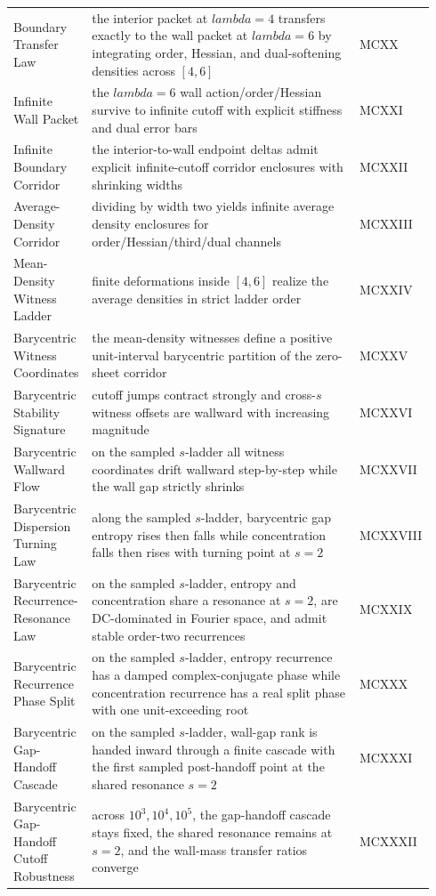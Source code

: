 \documentclass[11pt]{article}
\def\lambda{lambda}%
\begin{document}
{\begin{longtable}{>{\raggedright\arraybackslash}p{0.18\linewidth} >{\raggedright\arraybackslash}p{0.63\linewidth} >{\raggedright\arraybackslash}p{0.13\linewidth}}
Boundary Transfer Law & the interior packet at $\lambda=4$ transfers exactly to the wall packet at $\lambda=6$ by integrating order, Hessian, and dual-softening densities across $[4,6]$ & MCXX \\
Infinite Wall Packet & the $\lambda=6$ wall action/order/Hessian survive to infinite cutoff with explicit stiffness and dual error bars & MCXXI \\
Infinite Boundary Corridor & the interior-to-wall endpoint deltas admit explicit infinite-cutoff corridor enclosures with shrinking widths & MCXXII \\
Average-Density Corridor & dividing by width two yields infinite average density enclosures for order/Hessian/third/dual channels & MCXXIII \\
Mean-Density Witness Ladder & finite deformations inside $[4,6]$ realize the average densities in strict ladder order & MCXXIV \\
Barycentric Witness Coordinates & the mean-density witnesses define a positive unit-interval barycentric partition of the zero-sheet corridor & MCXXV \\
Barycentric Stability Signature & cutoff jumps contract strongly and cross-$s$ witness offsets are wallward with increasing magnitude & MCXXVI \\
Barycentric Wallward Flow & on the sampled $s$-ladder all witness coordinates drift wallward step-by-step while the wall gap strictly shrinks & MCXXVII \\
Barycentric Dispersion Turning Law & along the sampled $s$-ladder, barycentric gap entropy rises then falls while concentration falls then rises with turning point at $s=2$ & MCXXVIII \\
Barycentric Recurrence-Resonance Law & on the sampled $s$-ladder, entropy and concentration share a resonance at $s=2$, are DC-dominated in Fourier space, and admit stable order-two recurrences & MCXXIX \\
Barycentric Recurrence Phase Split & on the sampled $s$-ladder, entropy recurrence has a damped complex-conjugate phase while concentration recurrence has a real split phase with one unit-exceeding root & MCXXX \\
Barycentric Gap-Handoff Cascade & on the sampled $s$-ladder, wall-gap rank is handed inward through a finite cascade with the first sampled post-handoff point at the shared resonance $s=2$ & MCXXXI \\
Barycentric Gap-Handoff Cutoff Robustness & across $10^3,10^4,10^5$, the gap-handoff cascade stays fixed, the shared resonance remains at $s=2$, and the wall-mass transfer ratios converge & MCXXXII \\

\end{longtable}}
\end{document}
